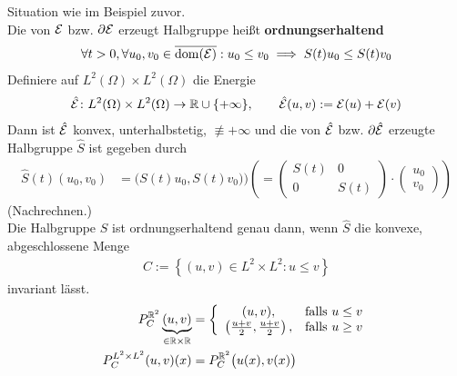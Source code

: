 \begin{beispiel}
	Situation wie im Beispiel zuvor.\\
	Die von $\mathcal{E}$ bzw. $\partial\mathcal{E}$ erzeugt Halbgruppe heißt \textbf{ordnungserhaltend}
	\begin{align*}
		\forall t>0,\forall u_0,v_0\in\overline{\operatorname{dom}(\mathcal{E})}:
		u_0\leq v_0\implies S(t) u_0\leq S(t) v_0
	\end{align*}
	Definiere auf $L^2(\Omega)\times L^2(\Omega)$ die Energie
	\begin{align*}
		\hat{\mathcal{E}}\colon L^2(\Omega)\times L^2(\Omega)\to\mathbb{R}\cup\lbrace+\infty\rbrace,\qquad
		\hat{\mathcal{E}}(u,v):=\mathcal{E}(u)+\mathcal{E}(v)
	\end{align*}		
	Dann ist $\hat{\mathcal{E}}$ konvex, unterhalbstetig, $\not\equiv+\infty$ und die von $\hat{\mathcal{E}}$ bzw. $\partial\hat{\mathcal{E}}$ erzeugte Halbgruppe $\hat{S}$ ist gegeben durch 
	\begin{align*}
		\hat{S}(t)(u_0,v_0)
		&=\big(S(t)u_0,S(t)v_0)\big)
		\left(=\begin{pmatrix}
			S(t) & 0\\
			0 & S(t)
		\end{pmatrix}\cdot\begin{pmatrix}
			u_0\\
			v_0
		\end{pmatrix}\right)
	\end{align*}
	(Nachrechnen.)\\
	Die Halbgruppe $S$ ist ordnungserhaltend genau dann, wenn $\hat{S}$ die konvexe, abgeschlossene Menge
	\begin{align*}
		C:=\left\lbrace(u,v)\in L^2\times L^2:u\leq v\right\rbrace
	\end{align*}
	invariant lässt.
	\begin{align*}
		P_C^{\mathbb{R}^2}\underbrace{(u,v)}_{\in\mathbb{R}\times\mathbb{R}}&=
		\left\lbrace\begin{array}{cl}
			(u,v),&\text{falls } u\leq v\\
			\left(\frac{u+v}{2},\frac{u+v}{2}\right) ,&\text{falls } u\geq v
		\end{array}\right.\\
		P_C^{L^2\times L^2}(u,v)(x)&=P_C^{\mathbb{R}^2}\big(u(x),v(x)\big)
	\end{align*}
	

\end{beispiel}
